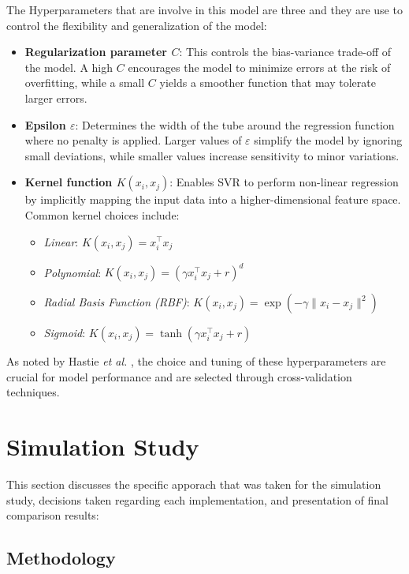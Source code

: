 \documentclass[8pt,twocolumn]{article}
\begin{document}
The Hyperparameters that are involve in this model are three and they are use to control
the flexibility and generalization of the model:

\begin{itemize}
    \item \textbf{Regularization parameter $C$}: This controls the bias-variance trade-off of the model. A high $C$ encourages the model to minimize errors at the risk of overfitting, while a small $C$ yields a smoother function that may tolerate larger errors.
    \item \textbf{Epsilon $\varepsilon$}: Determines the width of the tube around the regression function where no penalty is applied. Larger values of $\varepsilon$ simplify the model by ignoring small deviations, while smaller values increase sensitivity to minor variations.
    \item \textbf{Kernel function $K(x_i, x_j)$}: Enables SVR to perform non-linear regression by implicitly mapping the input data into a higher-dimensional feature space. Common kernel choices include:
    \begin{itemize}
        \item \textit{Linear}: $K(x_i, x_j) = x_i^\top x_j$
        \item \textit{Polynomial}: $K(x_i, x_j) = (\gamma x_i^\top x_j + r)^d$
        \item \textit{Radial Basis Function (RBF)}: $K(x_i, x_j) = \exp(-\gamma \|x_i - x_j\|^2)$
        \item \textit{Sigmoid}: $K(x_i, x_j) = \tanh(\gamma x_i^\top x_j + r)$
    \end{itemize}
\end{itemize}

As noted by Hastie \emph{et al.} \cite{hastie2009elements}, the choice and tuning of these hyperparameters are crucial for model performance and are selected through cross-validation techniques.


\section{Simulation Study}

This section discusses the specific apporach that was taken for the simulation
study, decisions taken regarding each implementation, and presentation of final
comparison results:

\subsection{Methodology}
\end{document}
